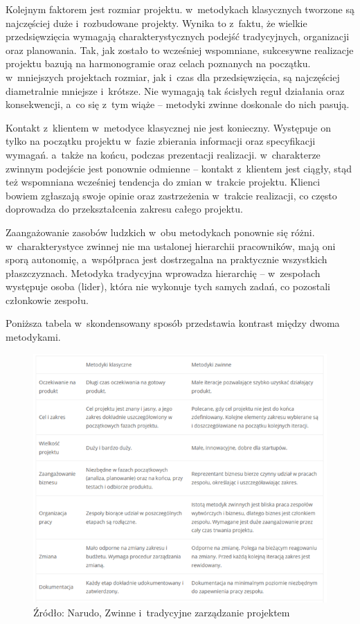 \documentclass[oneside,polski,logo]{amuthesis}
\begin{document}
Kolejnym faktorem jest rozmiar projektu. w~metodykach klasycznych tworzone są najczęściej duże i~rozbudowane projekty. Wynika to z~faktu, że wielkie przedsięwzięcia wymagają charakterystycznych podejść tradycyjnych, organizacji oraz planowania. Tak, jak zostało to wcześniej wspomniane, sukcesywne realizacje projektu bazują na harmonogramie oraz celach poznanych na początku. w~mniejszych projektach rozmiar, jak i~czas dla przedsięwzięcia, są najczęściej diametralnie mniejsze i~krótsze. Nie wymagają tak ścisłych reguł działania oraz konsekwencji, a~co się z~tym wiąże – metodyki zwinne doskonale do nich pasują.

Kontakt z~klientem w~metodyce klasycznej nie jest konieczny. Występuje on tylko na początku projektu w~fazie zbierania informacji oraz specyfikacji wymagań. a~także na końcu, podczas prezentacji realizacji. w~charakterze zwinnym podejście jest ponownie odmienne – kontakt z~klientem jest ciągły, stąd też wspomniana wcześniej tendencja do zmian w~trakcie projektu. Klienci bowiem zgłaszają swoje opinie oraz zastrzeżenia w~trakcie realizacji, co często doprowadza do przekształcenia zakresu całego projektu.

Zaangażowanie zasobów ludzkich w~obu metodykach ponownie się różni. w~charakterystyce zwinnej nie ma ustalonej hierarchii pracowników, mają oni sporą autonomię, a~współpraca jest dostrzegalna na praktycznie wszystkich płaszczyznach. Metodyka tradycyjna wprowadza hierarchię – w~zespołach występuje osoba (lider), która nie wykonuje tych samych zadań, co pozostali członkowie zespołu. \cite{modele} \cite{agileVwaterfall}

Poniższa tabela w~skondensowany sposób przedstawia kontrast między dwoma metodykami.

\begin{figure}[h]
	\centering
	\includegraphics[width=13cm]{images/hyps/zwinne-tradycyjne.png}
	\caption{Źródło: Narudo, Zwinne i~tradycyjne zarządzanie projektem}
\end{figure}
\end{document}
